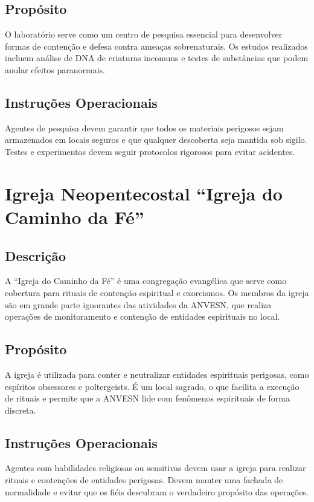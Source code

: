 \documentclass{book}
\begin{document}
\section{Propósito}
O laboratório serve como um centro de pesquisa essencial para desenvolver formas de contenção e defesa contra ameaças sobrenaturais. Os estudos realizados incluem análise de DNA de criaturas incomuns e testes de substâncias que podem anular efeitos paranormais.

\section{Instruções Operacionais}
Agentes de pesquisa devem garantir que todos os materiais perigosos sejam armazenados em locais seguros e que qualquer descoberta seja mantida sob sigilo. Testes e experimentos devem seguir protocolos rigorosos para evitar acidentes.

\chapter{Igreja Neopentecostal ``Igreja do Caminho da Fé''}
\section{Descrição}
A ``Igreja do Caminho da Fé'' é uma congregação evangélica que serve como cobertura para rituais de contenção espiritual e exorcismos. Os membros da igreja são em grande parte ignorantes das atividades da ANVESN, que realiza operações de monitoramento e contenção de entidades espirituais no local.

\section{Propósito}
A igreja é utilizada para conter e neutralizar entidades espirituais perigosas, como espíritos obsessores e poltergeists. É um local sagrado, o que facilita a execução de rituais e permite que a ANVESN lide com fenômenos espirituais de forma discreta.

\section{Instruções Operacionais}
Agentes com habilidades religiosas ou sensitivas devem usar a igreja para realizar rituais e contenções de entidades perigosas. Devem manter uma fachada de normalidade e evitar que os fiéis descubram o verdadeiro propósito das operações.
\end{document}
